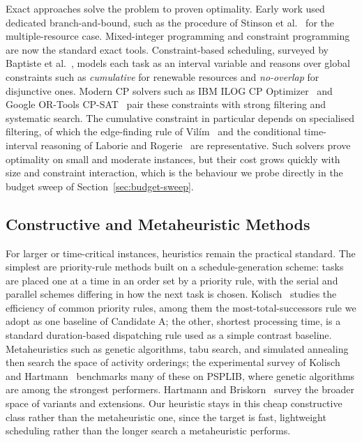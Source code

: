 \documentclass[conference]{IEEEtran}
\begin{document}
Exact approaches solve the problem to proven optimality. Early work used
dedicated branch-and-bound, such as the procedure of Stinson et
al.~\cite{stinson1978multiple} for the multiple-resource case.
Mixed-integer programming and constraint programming are now the
standard exact tools. Constraint-based scheduling, surveyed by
Baptiste et al.~\cite{Baptiste2001}, models each task as an interval
variable and reasons over global constraints such as \emph{cumulative}
for renewable resources and \emph{no-overlap} for disjunctive ones.
Modern CP solvers such as IBM ILOG CP Optimizer~\cite{laborie2018ibm}
and Google OR-Tools CP-SAT~\cite{ortools} pair these constraints with
strong filtering and systematic search. The cumulative constraint in
particular depends on specialised filtering, of which the edge-finding
rule of Vil\'im~\cite{vilim2011fastcumulative} and the conditional
time-interval reasoning of Laborie and
Rogerie~\cite{laborie2008complete} are representative. Such solvers
prove optimality on small and moderate instances, but their cost grows
quickly with size and constraint interaction, which is the behaviour we
probe directly in the budget sweep of Section~\ref{sec:budget-sweep}.

\subsection{Constructive and Metaheuristic Methods}

For larger or time-critical instances, heuristics remain the practical
standard. The simplest are priority-rule methods built on a
schedule-generation scheme: tasks are placed one at a time in an order
set by a priority rule, with the serial and parallel schemes differing
in how the next task is chosen. Kolisch~\cite{kolisch1996efficient}
studies the efficiency of common priority rules, among them the
most-total-successors rule we adopt as one baseline of Candidate A;
the other, shortest processing time, is a standard duration-based
dispatching rule used as a simple contrast baseline. Metaheuristics such as genetic
algorithms, tabu search, and simulated annealing then search the space
of activity orderings; the experimental survey of Kolisch and
Hartmann~\cite{kolisch2006experimental} benchmarks many of these on
PSPLIB, where genetic algorithms are among the strongest performers. Hartmann and Briskorn~\cite{hartmann2010survey}
survey the broader space of variants and extensions. Our heuristic
stays in this cheap constructive class rather than the metaheuristic
one, since the target is fast, lightweight scheduling rather than the
longer search a metaheuristic performs.
\end{document}
